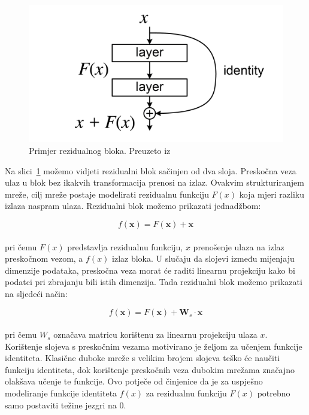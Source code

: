 \documentclass[times, utf8, zavrsni, numeric]{fer}
\begin{document}
\begin{figure}[htb]
    \centering
    \includegraphics{ResBlock.png}
    \caption{Primjer rezidualnog bloka. Preuzeto iz~\cite{he2016deep}}
    \label{fig:resblock}
\end{figure}

Na slici~\ref{fig:resblock} možemo vidjeti rezidualni blok sačinjen od dva sloja. Preskočna veza ulaz u blok bez ikakvih transformacija prenosi na izlaz. 
Ovakvim strukturiranjem mreže, cilj mreže postaje modelirati rezidualnu funkciju $F(x)$ koja mjeri razliku izlaza naspram ulaza. Rezidualni blok možemo prikazati jednadžbom:

\begin{equation}
    f(\pmb{x}) = F(\pmb{x}) + \pmb{x}
    \label{eq:resblock}
\end{equation}
\\
pri čemu $F(x)$ predstavlja rezidualnu funkciju, $x$ prenošenje ulaza na izlaz preskočnom vezom, a $f(x)$ izlaz bloka. 
U slučaju da slojevi između mijenjaju dimenzije podataka, preskočna veza morat će raditi linearnu projekciju kako bi podatci pri zbrajanju bili istih dimenzija. 
Tada rezidualni blok možemo prikazati na sljedeći način:

\begin{equation}
    f(\pmb{x}) = F(\pmb{x}) + \pmb{W}_{s} \cdot \pmb{x}
    \label{eq:resblocklp}
\end{equation}
\\
pri čemu $W_{s}$ označava matricu korištenu za linearnu projekciju ulaza $x$. 
Korištenje slojeva s preskočnim vezama motivirano je željom za učenjem funkcije identiteta.
Klasične duboke mreže s velikim brojem slojeva teško će naučiti funkciju identiteta, dok korištenje preskočnih veza dubokim mrežama značajno olakšava učenje te funkcije.
Ovo potječe od činjenice da je za uspješno modeliranje funkcije identiteta $f(x)$ za rezidualnu funkciju $F(x)$ potrebno samo postaviti težine jezgri na 0.
\end{document}

